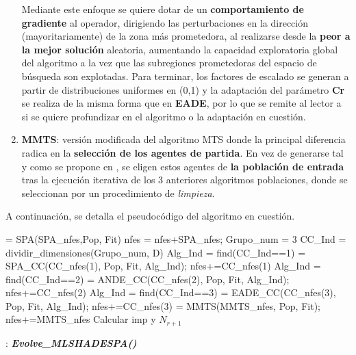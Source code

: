 \begin{enumerate}
\begin{itemize}
	\end{itemize}

	Mediante este enfoque se quiere dotar de un \textbf{comportamiento de gradiente} al operador, dirigiendo las perturbaciones en la dirección (mayoritariamente) de la zona más prometedora, al realizarse desde la \textbf{peor a la mejor solución} aleatoria, aumentando la capacidad exploratoria global del algoritmo a la vez que las subregiones prometedoras del espacio de búsqueda son explotadas. Para terminar, los factores de escalado se generan a partir de distribuciones uniformes en (0,1) y la adaptación del parámetro \textbf{Cr} se realiza de la misma forma que en \textbf{EADE}, por lo que se remite al lector a \cite{ANDE} si se quiere profundizar en el algoritmo o la adaptación en cuestión.
	
	\item \textbf{MMTS}: versión modificada del algoritmo MTS donde la principal diferencia radica en la \textbf{selección de los agentes de partida}. En vez de generarse tal y como se propone en \cite{MTS-LSGO}, se eligen estos agentes de \textbf{la población de entrada} tras la ejecución iterativa de los 3 anteriores algoritmos poblaciones, donde se seleccionan por un procedimiento de \textit{limpieza}. 
	
\end{enumerate} 

A continuación, se detalla el pseudocódigo del algoritmo en cuestión. 

\begin{algorithm}[h]
	\begin{algorithmic}[1]
		 = SPA(SPA\_nfes,Pop, Fit)
		\STATE nfes = nfes+SPA\_nfes; Grupo\_num = 3
		\STATE CC\_Ind = dividir\_dimensiones(Grupo\_num, D)
		\STATE Alg\_Ind = find(CC\_Ind==1)
		 = SPA\_CC(CC\_nfes(1), Pop, Fit, Alg\_Ind); nfes+=CC\_nfes(1)
		\STATE Alg\_Ind = find(CC\_Ind==2)
		 = ANDE\_CC(CC\_nfes(2), Pop, Fit, Alg\_Ind); nfes+=CC\_nfes(2)
		\STATE Alg\_Ind = find(CC\_Ind==3)
		 = EADE\_CC(CC\_nfes(3), Pop, Fit, Alg\_Ind); nfes+=CC\_nfes(3)	
		 = MMTS(MMTS\_nfes, Pop, Fit); nfes+=MMTS\_nfes
		\STATE Calcular imp y $N_{r+1}$	
	\end{algorithmic}
	\caption{: \textit{\textbf{Evolve\_MLSHADESPA()}}} \label{Alg: MLSHADE-SPA-EVOLVE}
\end{algorithm}


